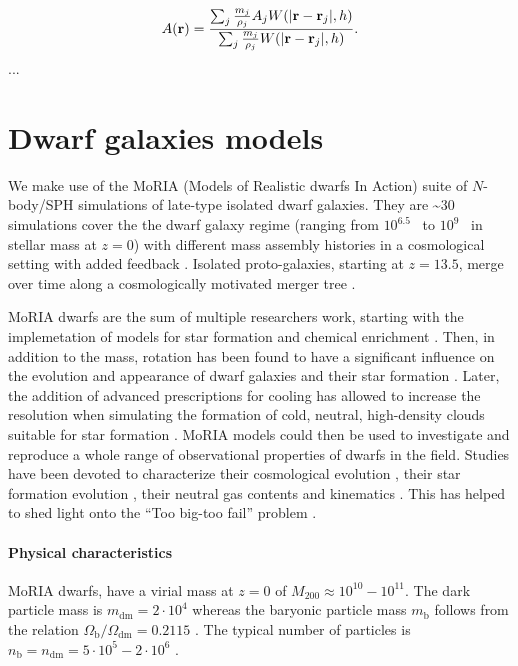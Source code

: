 \begin{equation}
 A(\boldsymbol{\mathbf{r}}) = \dfrac{\sum_j \frac{m_j}{\rho_j} A_j W(|\boldsymbol{\mathbf{r}} - \boldsymbol{\mathbf{r}}_j|,h)}{\sum_j \frac{m_j}{\rho_j} W(|\boldsymbol{\mathbf{r}} - \boldsymbol{\mathbf{r}}_j|,h)}.
\end{equation}
...

\section{Dwarf galaxies models}
\label{sec:dwarf_models}
We make use of the MoRIA (Models of Realistic dwarfs In Action) suite of $N$-body/SPH simulations of late-type isolated dwarf galaxies.
They are \textasciitilde$30$ simulations cover the the dwarf galaxy regime (ranging from $10^{6.5}$~\Msun{} to $10^9$~\Msun{} in stellar mass at $z=0$) with different mass assembly histories in a cosmological setting with added \popiii{} feedback \citep{Verbeke2017}.
Isolated proto-galaxies, starting at $z = 13.5$, merge over time along a cosmologically motivated merger tree \citep{Cloet-Osselaer2014}.

MoRIA dwarfs are the sum of multiple researchers work, starting with the implemetation of models for star formation and chemical enrichment \citep{Valcke2008}. 
Then, in addition to the mass, rotation has been found to have a significant influence on the evolution and appearance of dwarf galaxies and their star formation \citep{Schroyen2011}.
Later, the addition of advanced prescriptions for cooling has allowed to increase the resolution when simulating the formation of cold, neutral, high-density clouds suitable for star formation \citep{DeRijcke2013}. %
MoRIA models could then be used to investigate and reproduce a whole range of observational properties of dwarfs in the field.
Studies have been devoted to characterize their cosmological evolution \citep{Cloet-Osselaer2012}, their star formation evolution \citep{Verbeke2015}, their neutral gas contents and kinematics \citep{Koleva2014}.
This has helped to shed light onto the ``Too big-too fail'' problem \citep{Verbeke2017}.


\paragraph{Physical characteristics} MoRIA dwarfs, have a virial mass at $z=0$ of $M_{200} \approx 10^{10} - 10^{11}$\Msun{}. The dark particle mass is $m_{\mathrm{dm}} = 2 \cdot 10^4$ \Msun{} whereas the baryonic particle mass $m_{\mathrm{b}}$ follows from the relation $\Omega_\mathrm{b}/\Omega_{\mathrm{dm}} = 0.2115$ \citep{Planck2015}.
The typical number of particles is $n_\mathrm{b} = n_{\mathrm{dm}} = 5 \cdot 10^5 - 2 \cdot 10^6$ \Msun{}.

